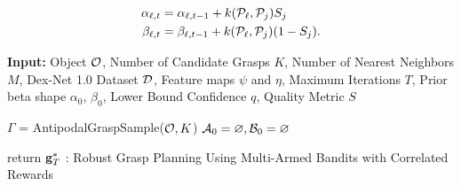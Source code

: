 \vspace{-2ex}
\begin{align}
	\alpha_{\ell,t} &= \alpha_{\ell,t-1} + k(\mathcal{P}_{\ell}, \mathcal{P}_{j}) S_{j} \label{eq:alpha} \\
	\beta_{\ell,t} &= \beta_{\ell,t-1} + k(\mathcal{P}_{\ell}, \mathcal{P}_{j}) (1 - S_{j})\label{eq:beta}.
\end{align}

\begin{algorithm}
{\small
    \SetAlgoLined
    {\bf Input:} Object $\mathcal{O}$, Number of Candidate Grasps $K$, Number of Nearest Neighbors $M$, Dex-Net 1.0 Dataset $\mathcal{D}$, Feature maps $\psi$ and $\eta$,  Maximum Iterations $T$, Prior beta shape $\alpha_0$, $\beta_0$, Lower Bound Confidence $q$, Quality Metric $S$ \\
    
	$\Gamma$ = AntipodalGraspSample($\mathcal{O}, K$) \;
	$\mathcal{A}_0 = \varnothing, \mathcal{B}_0 = \varnothing$\;
	
	return $\mathbf{g}_T^*$\;
    : Robust Grasp Planning Using Multi-Armed Bandits with Correlated Rewards
}
\end{algorithm}

